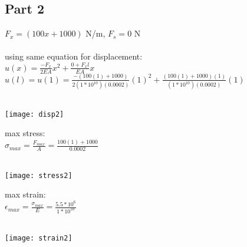 \documentclass{article}
\begin{document}
\subsection*{Part 2}
$F_x = (100x + 1000)$ N/m, $F_s = 0$ N \\\\
using same equation for displacement: \\
$u(x) = \frac{-F_x}{2EA}x^2 + \frac{0 + F_xl}{EA}x$ \\
$u(l) = u(1) = \frac{-(100(1) + 1000)}{2(1*10^{10})(0.0002)}(1)^2 +
\frac{(100(1) + 1000)(1)}{(1*10^{10})(0.0002)}(1) $ \\
 \\
\begin{center}
    \texttt{[image: disp2]}  
\end{center}
max stress: \\
$\sigma_{max} = \frac{F_{max}}{A} = \frac{100(1) + 1000}{0.0002}$\\
 \\
\begin{center}
    \texttt{[image: stress2]}  
\end{center}
max strain: \\
$\epsilon_{max} = \frac{\sigma_{max}}{E} = \frac{5.5*10^6}{1*10^{10}} $\\
 \\
\begin{center}
    \texttt{[image: strain2]}  
\end{center}
\end{document}

